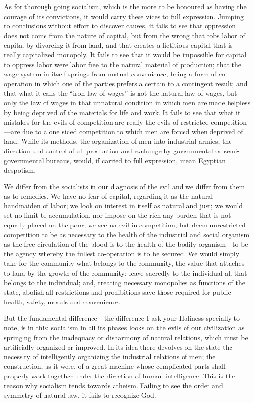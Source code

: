 \documentclass{book}
\begin{document}
As for thorough going socialism, which is the more to be honoured as having the courage of its convictions, it would carry these vices to full expression. Jumping to conclusions without effort to discover causes, it fails to see that oppression does not come from the nature of capital, but from the wrong that robs labor of capital by divorcing it from land, and that creates a fictitious capital that is really capitalized monopoly. It fails to see that it would be impossible for capital to oppress labor were labor free to the natural material of production; that the wage system in itself springs from mutual convenience, being a form of co-operation in which one of the parties prefers a certain to a contingent result; and that what it calls the “iron law of wages” is not the natural law of wages, but only the law of wages in that unnatural condition in which men are made helpless by being deprived of the materials for life and work. It fails to see that what it mistakes for the evils of competition are really the evils of restricted competition—are due to a one sided competition to which men are forced when deprived of land. While its methods, the organization of men into industrial armies, the direction and control of all production and exchange by governmental or semi-governmental bureaus, would, if carried to full expression, mean Egyptian despotism.

We differ from the socialists in our diagnosis of the evil and we differ from them as to remedies. We have no fear of capital, regarding it as the natural handmaiden of labor; we look on interest in itself as natural and just; we would set no limit to accumulation, nor impose on the rich any burden that is not equally placed on the poor; we see no evil in competition, but deem unrestricted competition to be as necessary to the health of the industrial and social organism as the free circulation of the blood is to the health of the bodily organism—to be the agency whereby the fullest co-operation is to be secured. We would simply take for the community what belongs to the community, the value that attaches to land by the growth of the community; leave sacredly to the individual all that belongs to the individual; and, treating necessary monopolies as functions of the state, abolish all restrictions and prohibitions save those required for public health, safety, morals and convenience.

But the fundamental difference—the difference I ask your Holiness specially to note, is in this: socialism in all its phases looks on the evils of our civilization as springing from the inadequacy or disharmony of natural relations, which must be artificially organized or improved. In its idea there devolves on the state the necessity of intelligently organizing the industrial relations of men; the construction, as it were, of a great machine whose complicated parts shall properly work together under the direction of human intelligence. This is the reason why socialism tends towards atheism. Failing to see the order and symmetry of natural law, it fails to recognize God.
\end{document}
